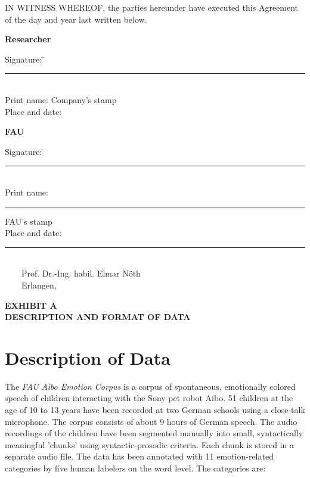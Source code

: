 \documentclass[11pt]{article}
\newcommand{\MyTextline}[2]{%
  \TextField[name=#1,multiline=false,borderstyle=U,bordercolor=hl,width=#2,height=1.5em]{~}
}
\begin{document}
\begin{Form}
  \vspace{3cm}


  IN WITNESS WHEREOF, the parties hereunder have executed this Agreement of the day and year last written below.

  \textbf{Researcher}
%
  \begin{tabbing}
    Signature: \hspace{1.5cm} \= ~~\rule{6.5cm}{0.5pt} \\[.5em]
    Print name:        \> \TextField[name=SignatureName,multiline=false,borderstyle=U,bordercolor=hl,width=6.5cm,height=1.5em]{~} 
    \hspace{2cm} {\color{gray} Company's stamp} \\[.5em]
    Place and date:    \> \MyTextline{date}{6.5cm} \\
  \end{tabbing}
  

  \textbf{FAU}
%
  \begin{tabbing}
    Signature: \hspace{1.5cm} \= ~~\rule{6.5cm}{0.5pt} \\[.5cm]
    Print name:        \> ~~\rule{6.5cm}{0.5pt} \hspace{2.4cm} {\color{gray} FAU's stamp}  \\[.5cm]
    Place and date:    \> ~~\rule{6.5cm}{0.5pt} \\[-1.6cm]
                       \> ~~~~Prof. Dr.-Ing. habil. Elmar N{\"o}th \\[.5cm]
                       \> ~~~~Erlangen, 
  \end{tabbing}

  \clearpage


  \begin{center}
    \sffamily \Large \textbf{EXHIBIT A} \\[.5em]
    \textbf{DESCRIPTION AND FORMAT OF DATA}
  \end{center}

  \section*{Description of Data}

  The \emph{FAU Aibo Emotion Corpus} is a corpus of spontaneous, emotionally colored speech of children interacting with the Sony pet robot Aibo.
  51 children at the age of 10 to 13 years have been recorded at two German schools using a close-talk microphone.
  The corpus consists of about 9 hours of German speech.
  The audio recordings of the children have been segmented manually into small, syntactically meaningful 'chunks' using syntactic-prosodic criteria.
  Each chunk is stored in a separate audio file.
  The data has been annotated with 11 emotion-related categories by five human labelers on the word level.
  The categories are:   


\end{Form}
\end{document}
